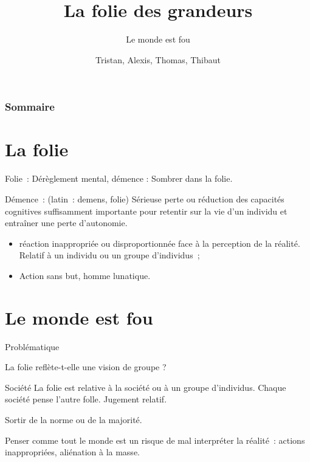 \documentclass{beamer}
\title{La folie des grandeurs}
\subtitle{Le monde est fou}
\author{Tristan, Alexis, Thomas, Thibaut}
\begin{document}
\begin{frame}
  \titlepage
\end{frame}

\begin{frame}
    \frametitle{Sommaire}
    \begin{multicols}{2}
      {
		\setcounter{tocdepth}{1}
        \tableofcontents
      }
    \end{multicols}
\end{frame}

\section{La folie}

\begin{frame}
  \begin{displayquote}
    Folie~: Dérèglement mental, démence : Sombrer dans la folie.

    Démence~: (latin~: demens, folie) Sérieuse perte ou réduction des capacités cognitives suffisamment importante pour retentir sur la vie d'un individu et entraîner une perte d'autonomie.
  \end{displayquote}
\end{frame}

\begin{frame}
  \begin{itemize}
    \item réaction inappropriée ou disproportionnée face à la perception de la réalité. Relatif à un individu ou un groupe d'individus~;
    \item Action sans but, homme lunatique.
  \end{itemize}
\end{frame}

\section{Le monde est fou}

\begin{frame}{Problématique}
  \begin{center}
    La folie reflète-t-elle une vision de groupe ?
  \end{center}
\end{frame}

\begin{frame}{Société}
  La folie est relative à la société ou à un groupe d'individus.
  Chaque société pense l'autre folle. Jugement relatif.

  Sortir de la norme ou de la majorité.

  Penser comme tout le monde est un risque de mal interpréter la réalité~: actions inappropriées, aliénation à la masse.
\end{frame}
\end{document}
